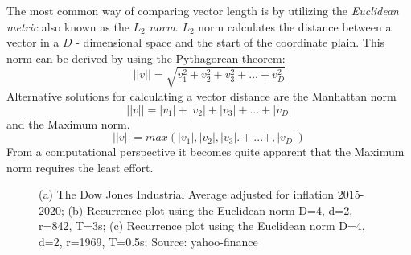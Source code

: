 \documentclass[a4paper,12pt,fleqn]{article}
\begin{document}
The most common way of comparing vector length is by utilizing the \emph{Euclidean metric} also known as the $L_2$ \emph{norm}.
$L_2$ norm calculates the distance between a vector in a $D$ - dimensional space and the start of the coordinate plain.
This norm can be derived by using the Pythagorean theorem:
\[
  ||v|| = \sqrt{v_1^2 + v_2^2 + v_3^2 + ... + v_D^2}
\]
Alternative solutions for calculating a vector distance are the Manhattan norm
\[
  ||v|| = |v_1| + |v_2| + |v_3| + ... + |v_D|
\]
and the Maximum norm.
\[
  ||v|| = max(|v_1|,|v_2|,|v_3|.+ ... +,|v_D|)
\]
From a computational perspective it becomes quite apparent that the Maximum norm requires the least effort.
\begin{figure}[ht!]
  \hspace{\fill}
  \hspace{\fill}
  \caption{\label{fig:theory_dji}(a) The Dow Jones Industrial Average adjusted for inflation 2015-2020; (b) Recurrence plot using the Euclidean norm D=4, d=2, r=842, T=3s; (c) Recurrence plot using the Euclidean norm D=4, d=2, r=1969, T=0.5s; Source: yahoo-finance~\cite{yahoo-finance}}
\end{figure}
\end{document}
